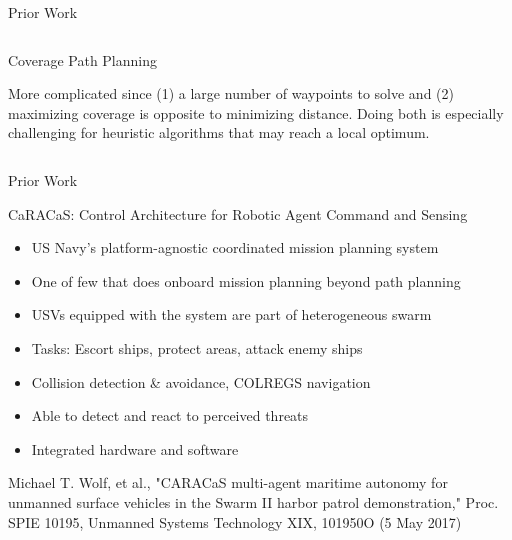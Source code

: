 \documentclass[9pt]{beamer}
\begin{document}
\begin{frame}{Prior Work}
\begin{columns}
\begin{column}{0.45\textwidth}
\begin{block}{Coverage Path Planning}
\begin{center}
                    \linebreak
                    More complicated since (1) a large number of waypoints to solve and (2) maximizing coverage is opposite to minimizing distance. Doing both is especially challenging for heuristic algorithms that may reach a local optimum.
                \end{center}
            \end{block}
        \end{column}
    \end{columns}
\end{frame}

\begin{frame}{Prior Work} 
    \begin{block}{CaRACaS: Control Architecture for Robotic Agent Command and Sensing}
	    \begin{itemize}
	        \item US Navy's platform-agnostic coordinated mission planning system
    	    \item One of few that does onboard mission planning beyond path planning
            \item USVs equipped with the system are part of heterogeneous swarm
	        \item Tasks: Escort ships, protect areas, attack enemy ships
    	    \item Collision detection \& avoidance, COLREGS navigation
    	    \item Able to detect and react to perceived threats
    	    \item Integrated hardware and software
    	    \end{itemize}
    	    
            \small{Michael T. Wolf, et al., "CARACaS multi-agent maritime autonomy for unmanned surface vehicles in the Swarm II harbor patrol demonstration," Proc. SPIE 10195, Unmanned Systems Technology XIX, 101950O (5 May 2017)}

    	    
    \end{block}
\end{frame}  
\end{document}
